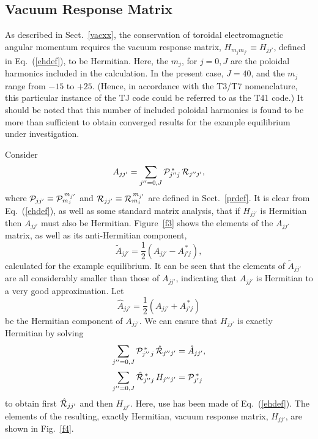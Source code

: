 \documentclass[12pt,prb,aps]{revtex4-1}
\begin{document}
\subsection{Vacuum Response Matrix}
As described in Sect.~\ref{vacxx}, the conservation
 of toroidal electromagnetic angular momentum requires the vacuum response matrix, $H_{m_j m_{j'}}\equiv H_{jj'}$, defined in Eq.~(\ref{ehdef}), to
 be Hermitian. Here, the $m_j$, for $j=0,J$ are the poloidal harmonics included in the calculation. In the present case,
 $J=40$, and the $m_j$ range from $-15$ to $+25$.  (Hence, in accordance with the T3/T7 nomenclature, this
 particular instance of the TJ code could be referred to as the T41 code.) It should be noted that this number of included poloidal harmonics is
 found to be more than sufficient to obtain converged results for the example equilibrium under investigation.
 
  Consider
 \begin{equation}
 A_{jj'} = \sum_{j''=0,J} {\cal P}_{j''j}^{\,\ast}\,{\cal R}_{j''j'},
 \end{equation}
 where ${\cal P}_{jj'}\equiv {\cal P}_{m_j}^{\,m_{j'}}$ and ${\cal R}_{jj'}\equiv {\cal R}_{m_j}^{\,m_{j'}}$ are defined in Sect.~\ref{prdef}. It is clear from Eq.~(\ref{ehdef}), as well as some standard matrix analysis,  that if $H_{jj'}$ is  Hermitian then  $A_{jj'}$ must also be
 Hermitian. Figure~\ref{f3} shows the elements of the $A_{jj'}$ matrix, as well as its
 anti-Hermitian component,
 \begin{equation}
 \tilde{A}_{jj'} = \frac{1}{2}\left(A_{jj'} - A_{j'j}^{\,\ast}\right),
 \end{equation}
 calculated for the example equilibrium. It can be seen that the elements of $\tilde{A}_{jj'}$ are all considerably smaller than those of $A_{jj'}$,
 indicating that $A_{jj'}$ is Hermitian to a very good approximation. Let
 \begin{equation}
 \hat{A}_{jj'} = \frac{1}{2}\left(A_{jj'} +A_{j'j}^{\,\ast}\right)
 \end{equation}
 be the Hermitian component of $A_{jj'}$. We can ensure that $H_{jj'}$ is exactly Hermitian by solving
 \begin{align}
  \sum_{j''=0,J} {\cal P}_{j''\,j}^{\,\ast}\,\hat{\cal R}_{j''j'}&=\hat{A}_{jj'},\\[0.5ex]
  \sum_{j''=0,J} \hat{\cal R}_{j''j}^{\,\ast}\,H_{j''j'}&={\cal P}_{j'j}^{\,\ast}
 \end{align}
 to obtain first $\hat{{\cal R}}_{jj'}$ and then $H_{jj'}$. 
 Here, use has been made of Eq.~(\ref{ehdef}). The elements of the resulting, exactly Hermitian, vacuum response matrix, $H_{jj'}$, 
 are shown in Fig.~\ref{f4}.
 
\end{document}
